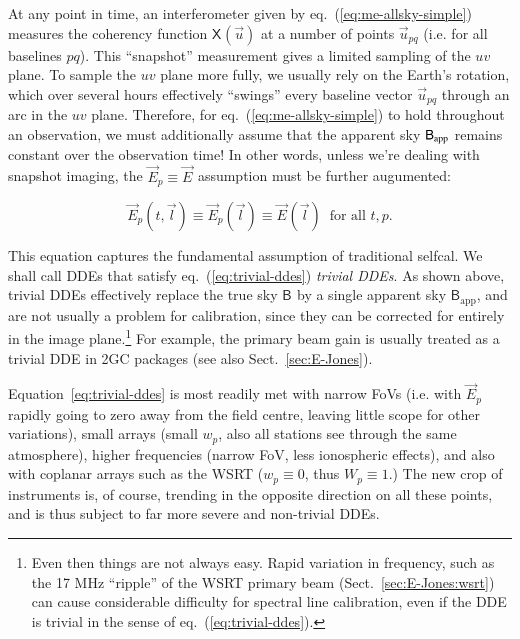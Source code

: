 \documentclass[]{aa}
\newcommand{\jones}[2]{\vec {#1}_{#2}}
\newcommand{\coh}[2]{\mathsf{{#1}}_{{#2}}}
\begin{document}
At any point in time, an interferometer given by eq.~(\ref{eq:me-allsky-simple}) measures the coherency function $\coh{X}{}(\vec u)$ at a number of points $\vec u_{pq}$ (i.e. for all baselines $pq$). This ``snapshot'' measurement gives a limited sampling of the $uv$ plane. To sample the $uv$ plane more fully, we usually rely on the Earth's rotation, which over several hours effectively ``swings'' every baseline vector $\vec u_{pq}$ through an arc in the $uv$ plane. Therefore, for eq.~(\ref{eq:me-allsky-simple}) to hold throughout an observation, we must additionally assume that the apparent sky $\coh{B}{\rm app}$ remains constant over the observation time! In other words, unless we're dealing with snapshot imaging, the $\jones{E}{p}\equiv\jones{E}{}$ assumption must be further augumented:

\begin{equation}\label{eq:trivial-ddes}
\jones{E}{p}(t,\vec l) \equiv \jones{E}{p}(\vec l) \equiv \jones{E}{}(\vec l)\;\;\mbox{for all~} t,p. 
\end{equation}

This equation captures the fundamental assumption of traditional selfcal. We shall call DDEs that satisfy eq.~(\ref{eq:trivial-ddes}) \emph{trivial DDEs}. As shown above, trivial DDEs effectively replace the true sky $\coh{B}{}$ by a single apparent sky $\coh{B}{\mathrm{app}}$, and are not usually a problem for calibration, since they can be corrected for entirely in the image plane.\footnote{Even then things are not always easy. Rapid variation in frequency, such as the 17 MHz ``ripple'' of the WSRT primary beam (Sect.~\ref{sec:E-Jones:wsrt}) can cause considerable difficulty for spectral line calibration, even if the DDE is trivial in the sense of eq.~(\ref{eq:trivial-ddes}).}  For example, the primary beam gain is usually treated as a trivial DDE in 2GC packages (see also Sect.~\ref{sec:E-Jones}). 

Equation~\ref{eq:trivial-ddes} is most readily met with narrow FoVs (i.e. with $\jones{E}{p}$ rapidly going to zero away from the field centre, leaving little scope for other variations), small arrays (small $w_p$, also all stations see through the same atmosphere), higher frequencies (narrow FoV, less ionospheric effects), and also with coplanar arrays such as the WSRT ($w_p\equiv0$, thus $W_p\equiv1$.) The new crop of instruments is, of course, trending in the opposite direction on all these points, and is thus subject to far more severe and non-trivial DDEs.
\end{document}
